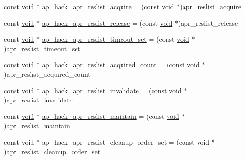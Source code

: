 \begin{DoxyCompactItemize}
\item 
const \hyperlink{group__MOD__ISAPI_gacd6cdbf73df3d9eed42fa493d9b621a6}{void} $\ast$ \hyperlink{srclib_2apr-util_2exports_8c_a666d9b93fadab0b90920bc720c03a24d}{ap\+\_\+hack\+\_\+apr\+\_\+reslist\+\_\+acquire} = (const \hyperlink{group__MOD__ISAPI_gacd6cdbf73df3d9eed42fa493d9b621a6}{void} $\ast$)apr\+\_\+reslist\+\_\+acquire
\item 
const \hyperlink{group__MOD__ISAPI_gacd6cdbf73df3d9eed42fa493d9b621a6}{void} $\ast$ \hyperlink{srclib_2apr-util_2exports_8c_a63338b3984b185a7af3930ae4a153486}{ap\+\_\+hack\+\_\+apr\+\_\+reslist\+\_\+release} = (const \hyperlink{group__MOD__ISAPI_gacd6cdbf73df3d9eed42fa493d9b621a6}{void} $\ast$)apr\+\_\+reslist\+\_\+release
\item 
const \hyperlink{group__MOD__ISAPI_gacd6cdbf73df3d9eed42fa493d9b621a6}{void} $\ast$ \hyperlink{srclib_2apr-util_2exports_8c_a8f122378f8acef77764739b44ad9b7f4}{ap\+\_\+hack\+\_\+apr\+\_\+reslist\+\_\+timeout\+\_\+set} = (const \hyperlink{group__MOD__ISAPI_gacd6cdbf73df3d9eed42fa493d9b621a6}{void} $\ast$)apr\+\_\+reslist\+\_\+timeout\+\_\+set
\item 
const \hyperlink{group__MOD__ISAPI_gacd6cdbf73df3d9eed42fa493d9b621a6}{void} $\ast$ \hyperlink{srclib_2apr-util_2exports_8c_a334add49b6cb0c8a279aba2f78e70b64}{ap\+\_\+hack\+\_\+apr\+\_\+reslist\+\_\+acquired\+\_\+count} = (const \hyperlink{group__MOD__ISAPI_gacd6cdbf73df3d9eed42fa493d9b621a6}{void} $\ast$)apr\+\_\+reslist\+\_\+acquired\+\_\+count
\item 
const \hyperlink{group__MOD__ISAPI_gacd6cdbf73df3d9eed42fa493d9b621a6}{void} $\ast$ \hyperlink{srclib_2apr-util_2exports_8c_abbb3779c230fdbecc6ff626ba1c3358e}{ap\+\_\+hack\+\_\+apr\+\_\+reslist\+\_\+invalidate} = (const \hyperlink{group__MOD__ISAPI_gacd6cdbf73df3d9eed42fa493d9b621a6}{void} $\ast$)apr\+\_\+reslist\+\_\+invalidate
\item 
const \hyperlink{group__MOD__ISAPI_gacd6cdbf73df3d9eed42fa493d9b621a6}{void} $\ast$ \hyperlink{srclib_2apr-util_2exports_8c_ab4c154ab331742f59acd1ea8291dd9e1}{ap\+\_\+hack\+\_\+apr\+\_\+reslist\+\_\+maintain} = (const \hyperlink{group__MOD__ISAPI_gacd6cdbf73df3d9eed42fa493d9b621a6}{void} $\ast$)apr\+\_\+reslist\+\_\+maintain
\item 
const \hyperlink{group__MOD__ISAPI_gacd6cdbf73df3d9eed42fa493d9b621a6}{void} $\ast$ \hyperlink{srclib_2apr-util_2exports_8c_abce268f0e778747dff264f1239afcb45}{ap\+\_\+hack\+\_\+apr\+\_\+reslist\+\_\+cleanup\+\_\+order\+\_\+set} = (const \hyperlink{group__MOD__ISAPI_gacd6cdbf73df3d9eed42fa493d9b621a6}{void} $\ast$)apr\+\_\+reslist\+\_\+cleanup\+\_\+order\+\_\+set

\end{DoxyCompactItemize}
